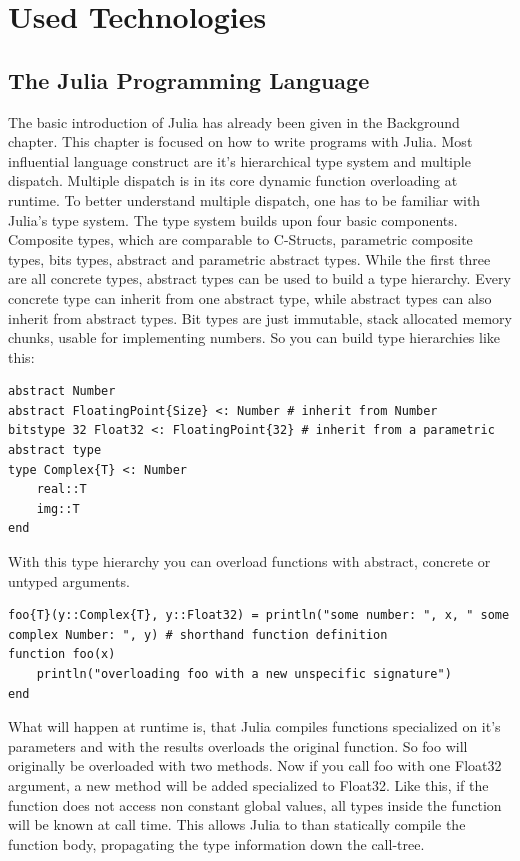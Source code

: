 \section{Used Technologies}

\subsection{The Julia Programming Language}
The basic introduction of Julia has already been given in the Background chapter.
This chapter is focused on how to write programs with Julia.
Most influential language construct are it's hierarchical type system and multiple dispatch.
Multiple dispatch is in its core dynamic function overloading at runtime. 
To better understand multiple dispatch, one has to be familiar with Julia's type system.
The type system builds upon four basic components. 
Composite types, which are comparable to C-Structs, parametric composite types, bits types, abstract and parametric abstract types.
While the first three are all concrete types, abstract types can be used to build a type hierarchy.
Every concrete type can inherit from one abstract type, while abstract types can also inherit from abstract types.
Bit types are just immutable, stack allocated memory chunks, usable for implementing numbers.
So you can build type hierarchies like this:
\begin{lstlisting}
abstract Number
abstract FloatingPoint{Size} <: Number # inherit from Number
bitstype 32 Float32 <: FloatingPoint{32} # inherit from a parametric abstract type
type Complex{T} <: Number
    real::T
    img::T
end
\end{lstlisting}
With this type hierarchy you can overload functions with abstract, concrete or untyped arguments.
\begin{lstlisting}
foo{T}(y::Complex{T}, y::Float32) = println("some number: ", x, " some complex Number: ", y) # shorthand function definition
function foo(x)
    println("overloading foo with a new unspecific signature")
end
\end{lstlisting}
What will happen at runtime is, that Julia compiles functions specialized on it's parameters and with the results overloads the original function.
So foo will originally be overloaded with two methods. 
Now if you call foo with one Float32 argument, a new method will be added specialized to Float32.
Like this, if the function does not access non constant global values, all types inside the function will be known at call time.
This allows Julia to than statically compile the function body, propagating the type information down the call-tree.

